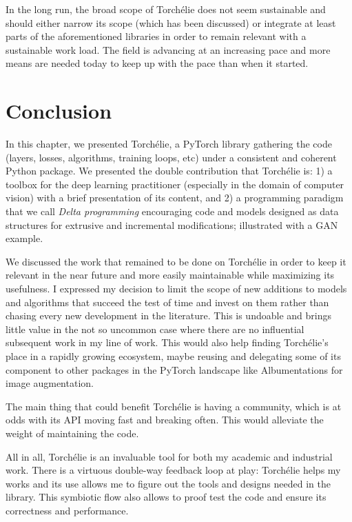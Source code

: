 In the long run, the broad scope of Torchélie does not seem sustainable and should either narrow its scope (which has been discussed) or integrate at least parts of the aforementioned libraries in order to remain relevant with a sustainable work load. The field is advancing at an increasing pace and more means are needed today to keep up with the pace than when it started.

\section{Conclusion}

In this chapter, we presented Torchélie, a PyTorch library gathering the code (layers, losses, algorithms, training loops, etc) under a consistent and coherent Python package. We presented the double contribution that Torchélie is: 1) a toolbox for the deep learning practitioner (especially in the domain of computer vision) with a brief presentation of its content, and 2) a programming paradigm that we call \emph{Delta programming} encouraging code and models designed as data structures for extrusive and incremental modifications; illustrated with a GAN example.

We discussed the work that remained to be done on Torchélie in order to keep it relevant in the near future and more easily maintainable while maximizing its usefulness. I expressed my decision to limit the scope of new additions to models and algorithms that succeed the test of time and invest on them rather than chasing every new development in the literature. This is undoable and brings little value in the not so uncommon case where there are no influential subsequent work in my line of work. This would also help finding Torchélie's place in a rapidly growing ecosystem, maybe reusing and delegating some of its component to other packages in the PyTorch landscape like Albumentations \cite{albumentations} for image augmentation.

The main thing that could benefit Torchélie is having a community, which is at odds with its API moving fast and breaking often. This would alleviate the weight of maintaining the code.

All in all, Torchélie is an invaluable tool for both my academic and industrial work. There is a virtuous double-way feedback loop at play: Torchélie helps my works and its use allows me to figure out the tools and designs needed in the library. This symbiotic flow also allows to proof test the code and ensure its correctness and performance.



